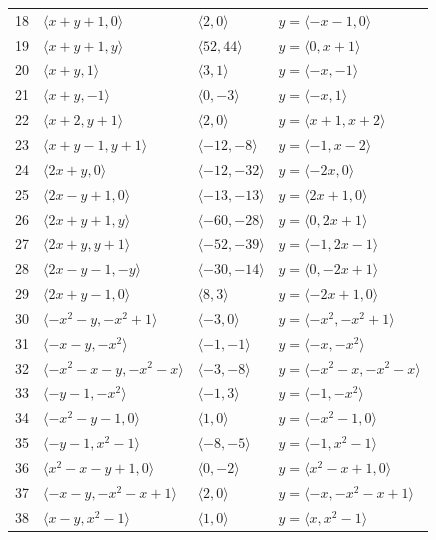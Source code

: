 \documentclass[11pt]{article}
\begin{document}
\begin{longtable}{@{}rlll@{}}
18 & $\langle x+y+1,0\rangle$ & $\langle 2,0\rangle$ & $y=\langle -x-1,0\rangle$\\
19 & $\langle x+y+1,y\rangle$ & $\langle 52,44\rangle$ & $y=\langle 0,x+1\rangle$\\
20 & $\langle x+y,1\rangle$ & $\langle 3,1\rangle$ & $y=\langle -x,-1\rangle$\\
21 & $\langle x+y,-1\rangle$ & $\langle 0,-3\rangle$ & $y=\langle -x,1\rangle$\\
22 & $\langle x+2,y+1\rangle$ & $\langle 2,0\rangle$ & $y=\langle x+1,x+2\rangle$\\
23 & $\langle x+y-1,y+1\rangle$ & $\langle -12,-8\rangle$ & $y=\langle -1,x-2\rangle$\\
24 & $\langle 2x+y,0\rangle$ & $\langle -12,-32\rangle$ & $y=\langle -2x,0\rangle$\\
25 & $\langle 2x-y+1,0\rangle$ & $\langle -13,-13\rangle$ & $y=\langle 2x+1,0\rangle$\\
26 & $\langle 2x+y+1,y\rangle$ & $\langle -60,-28\rangle$ & $y=\langle 0,2x+1\rangle$\\
27 & $\langle 2x+y,y+1\rangle$ & $\langle -52,-39\rangle$ & $y=\langle -1,2x-1\rangle$\\
28 & $\langle 2x-y-1,-y\rangle$ & $\langle -30,-14\rangle$ & $y=\langle 0,-2x+1\rangle$\\
29 & $\langle 2x+y-1,0\rangle$ & $\langle 8,3\rangle$ & $y=\langle -2x+1,0\rangle$\\
30 & $\langle -x^{2}-y,-x^{2}+1\rangle$ & $\langle -3,0\rangle$ & $y=\langle -x^{2},-x^{2}+1\rangle$\\
31 & $\langle -x-y,-x^{2}\rangle$ & $\langle -1,-1\rangle$ & $y=\langle -x,-x^{2}\rangle$\\
32 & $\langle -x^{2}-x-y,-x^{2}-x\rangle$ & $\langle -3,-8\rangle$ & $y=\langle -x^{2}-x,-x^{2}-x\rangle$\\
33 & $\langle -y-1,-x^{2}\rangle$ & $\langle -1,3\rangle$ & $y=\langle -1,-x^{2}\rangle$\\
34 & $\langle -x^{2}-y-1,0\rangle$ & $\langle 1,0\rangle$ & $y=\langle -x^{2}-1,0\rangle$\\
35 & $\langle -y-1,x^{2}-1\rangle$ & $\langle -8,-5\rangle$ & $y=\langle -1,x^{2}-1\rangle$\\
36 & $\langle x^{2}-x-y+1,0\rangle$ & $\langle 0,-2\rangle$ & $y=\langle x^{2}-x+1,0\rangle$\\
37 & $\langle -x-y,-x^{2}-x+1\rangle$ & $\langle 2,0\rangle$ & $y=\langle -x,-x^{2}-x+1\rangle$\\
38 & $\langle x-y,x^{2}-1\rangle$ & $\langle 1,0\rangle$ & $y=\langle x,x^{2}-1\rangle$\\

\end{longtable}
\end{document}

